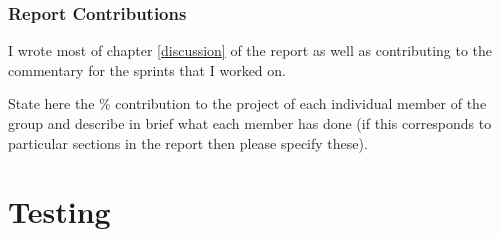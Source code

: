 \documentclass[a4paper, oneside, 11pt]{report}
\begin{document}
    \subsection{Report Contributions}
    I wrote most of chapter \ref{discussion} of the report as well as contributing to the commentary for the sprints that I worked on.

    State here the \% contribution to the project of each individual member of the group and describe in brief what each member has done (if this corresponds to particular sections in the report then please specify these).

    \chapter{Testing}
    \label{app:test}

\end{document}
